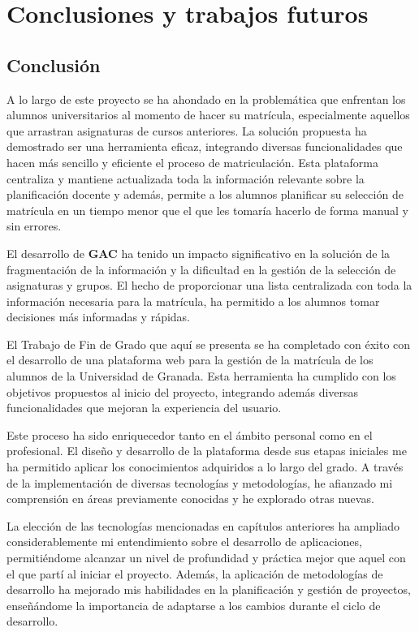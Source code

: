\chapter{Conclusiones y trabajos futuros}

\section{Conclusión}

A lo largo de este proyecto se ha ahondado en la problemática que enfrentan los alumnos universitarios al momento de hacer su matrícula, especialmente aquellos que arrastran asignaturas de cursos anteriores. La solución propuesta ha demostrado ser una herramienta eficaz, integrando diversas funcionalidades que hacen más sencillo y eficiente el proceso de matriculación. Esta plataforma centraliza y mantiene actualizada toda la información relevante sobre la planificación docente y además, permite a los alumnos planificar su selección de matrícula en un tiempo menor que el que les tomaría hacerlo de forma manual y sin errores.\newline

El desarrollo de \textbf{GAC} ha tenido un impacto significativo en la solución de la fragmentación de la información y la dificultad en la gestión de la selección de asignaturas y grupos. El hecho de proporcionar una lista centralizada con toda la información necesaria para la matrícula, ha permitido a los alumnos tomar decisiones más informadas y rápidas.\newline

El Trabajo de Fin de Grado que aquí se presenta se ha completado con éxito con el desarrollo de una plataforma web para la gestión de la matrícula de los alumnos de la Universidad de Granada. Esta herramienta ha cumplido con los objetivos propuestos al inicio del proyecto, integrando además diversas funcionalidades que mejoran la experiencia del usuario.\newline

Este proceso ha sido enriquecedor tanto en el ámbito personal como en el profesional. El diseño y desarrollo de la plataforma desde sus etapas iniciales me ha permitido aplicar los conocimientos adquiridos a lo largo del grado. A través de la implementación de diversas tecnologías y metodologías, he afianzado mi comprensión en áreas previamente conocidas y he explorado otras nuevas.\newline

La elección de las tecnologías mencionadas en capítulos anteriores ha ampliado considerablemente mi entendimiento sobre el desarrollo de aplicaciones, permitiéndome alcanzar un nivel de profundidad y práctica mejor que aquel con el que partí al iniciar el proyecto. Además, la aplicación de metodologías de desarrollo ha mejorado mis habilidades en la planificación y gestión de proyectos, enseñándome la importancia de adaptarse a los cambios durante el ciclo de desarrollo.\newline

